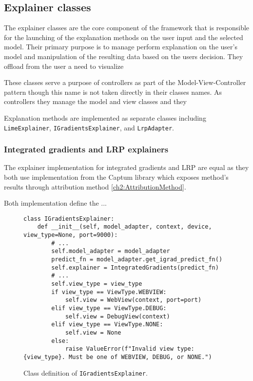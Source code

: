 \documentclass[
    bindingoffset=5mm,  %
    footnoteindent=3mm, %
    hyphenation=true    %
]{src/wut-thesis}
\begin{document}

\subsection{Explainer classes}

The explainer classes are the core component of the framework that is responsible
for the launching of the explanation methods on the user input and the
selected model. Their primary purpose is to manage perform explanation
on the user's model and manipulation of the resulting data based on the users decision.
They offload from the user a need to visualize 

These classes serve a purpose of controllers as part of the Model-View-Controller
pattern though this name is not taken directly in their classes names.
As controllers they manage the model and view classes and they

Explanation methods are implemented as separate classes including \texttt{LimeExplainer},
\texttt{IGradientsExplainer}, and \texttt{LrpAdapter}.

\subsubsection{Integrated gradients and LRP explainers}

The explainer implementation for integrated gradients and LRP are equal as
they both use implementation from the Captum library which
exposes method's results through attribution method \ref{ch2:AttributionMethod}.

Both implementation define the ...

\begin{figure}%
\begin{verbatim}
class IGradientsExplainer:
    def __init__(self, model_adapter, context, device, view_type=None, port=9000):
        # ...
        self.model_adapter = model_adapter
        predict_fn = model_adapter.get_igrad_predict_fn()
        self.explainer = IntegratedGradients(predict_fn)
        # ...
        self.view_type = view_type
        if view_type == ViewType.WEBVIEW:
            self.view = WebView(context, port=port)
        elif view_type == ViewType.DEBUG:
            self.view = DebugView(context)
        elif view_type == ViewType.NONE:
            self.view = None
        else:
            raise ValueError(f"Invalid view type: {view_type}. Must be one of WEBVIEW, DEBUG, or NONE.")
\end{verbatim}
\caption{Class definition of \texttt{IGradientsExplainer}.}
\label{fig:IGradientsExplainer}
\end{figure}
\end{document}

